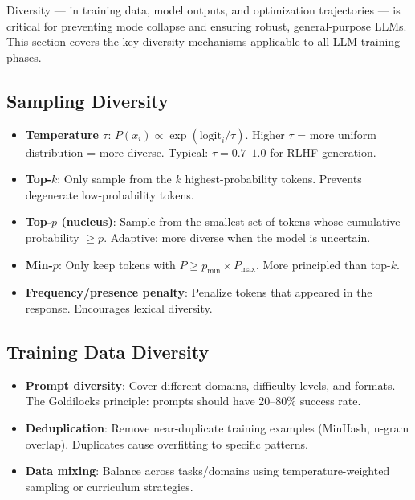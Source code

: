 Diversity --- in training data, model outputs, and optimization trajectories --- is critical for preventing mode collapse and ensuring robust, general-purpose LLMs. This section covers the key diversity mechanisms applicable to all LLM training phases.

\subsection{Sampling Diversity}
\label{sampling-diversity}

\begin{keybox}
\begin{itemize}
  \item \textbf{Temperature $\tau$}: $P(x_i) \propto \exp(\text{logit}_i / \tau)$. Higher $\tau$ = more uniform distribution = more diverse. Typical: $\tau=0.7$--$1.0$ for RLHF generation.
  \item \textbf{Top-$k$}: Only sample from the $k$ highest-probability tokens. Prevents degenerate low-probability tokens.
  \item \textbf{Top-$p$ (nucleus)}: Sample from the smallest set of tokens whose cumulative probability $\geq p$. Adaptive: more diverse when the model is uncertain.
  \item \textbf{Min-$p$}: Only keep tokens with $P \geq p_{\min} \times P_{\max}$. More principled than top-$k$.
  \item \textbf{Frequency/presence penalty}: Penalize tokens that appeared in the response. Encourages lexical diversity.
\end{itemize}
\end{keybox}

\subsection{Training Data Diversity}
\label{training-data-diversity}

\begin{itemize}
  \item \textbf{Prompt diversity}: Cover different domains, difficulty levels, and formats. The Goldilocks principle: prompts should have 20--80\% success rate.
  \item \textbf{Deduplication}: Remove near-duplicate training examples (MinHash, n-gram overlap). Duplicates cause overfitting to specific patterns.
  \item \textbf{Data mixing}: Balance across tasks/domains using temperature-weighted sampling or curriculum strategies.
\end{itemize}

